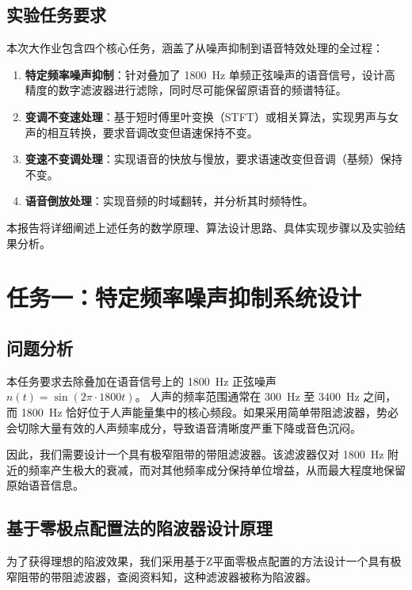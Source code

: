 \documentclass[12pt]{ctexart}
\begin{document}
\subsection{实验任务要求}
本次大作业包含四个核心任务，涵盖了从噪声抑制到语音特效处理的全过程：
\begin{enumerate}
    \item \textbf{特定频率噪声抑制}：针对叠加了 \SI{1800}{\hertz} 单频正弦噪声的语音信号，设计高精度的数字滤波器进行滤除，同时尽可能保留原语音的频谱特征。
    \item \textbf{变调不变速处理}：基于短时傅里叶变换（STFT）或相关算法，实现男声与女声的相互转换，要求音调改变但语速保持不变。
    \item \textbf{变速不变调处理}：实现语音的快放与慢放，要求语速改变但音调（基频）保持不变。
    \item \textbf{语音倒放处理}：实现音频的时域翻转，并分析其时频特性。
\end{enumerate}

本报告将详细阐述上述任务的数学原理、算法设计思路、具体实现步骤以及实验结果分析。

\newpage


\section{任务一：特定频率噪声抑制系统设计}

\subsection{问题分析}
本任务要求去除叠加在语音信号上的 \SI{1800}{\hertz} 正弦噪声 $n(t) = \sin(2\pi \cdot 1800 t)$。
人声的频率范围通常在 \SI{300}{\hertz} 至 \SI{3400}{\hertz} 之间，而 \SI{1800}{\hertz} 恰好位于人声能量集中的核心频段。如果采用简单带阻滤波器，势必会切除大量有效的人声频率成分，导致语音清晰度严重下降或音色沉闷。

因此，我们需要设计一个具有极窄阻带的带阻滤波器。该滤波器仅对 \SI{1800}{\hertz} 附近的频率产生极大的衰减，而对其他频率成分保持单位增益，从而最大程度地保留原始语音信息。

\subsection{基于零极点配置法的陷波器设计原理}
为了获得理想的陷波效果，我们采用基于Z平面零极点配置的方法设计一个具有极窄阻带的带阻滤波器，查阅资料知，这种滤波器被称为陷波器。
\end{document}
